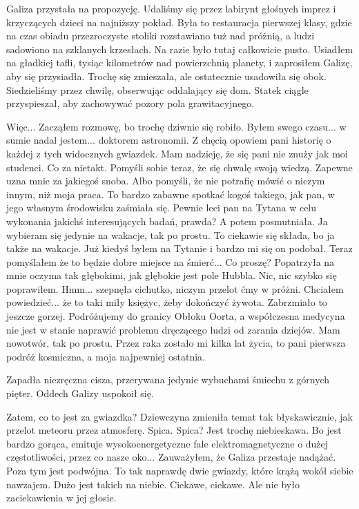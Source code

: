 Galiza przystała na propozycję.
Udaliśmy się przez labirynt głośnych imprez i krzyczących dzieci na najniższy pokład.
Była to restauracja pierwszej klasy, gdzie na czas obiadu przezroczyste stoliki rozstawiano tuż nad próżnią, a ludzi sadowiono na szklanych krzesłach.
Na razie było tutaj całkowicie pusto.
Usiadłem na gładkiej tafli, tysiąc kilometrów nad powierzchnią planety, i zaprosiłem Galizę, aby się przysiadła. Trochę się zmieszała, ale ostatecznie usadowiła się obok.
Siedzieliśmy przez chwilę, obserwując oddalający się dom. Statek ciągle przyspieszał, aby zachowywać pozory pola grawitacyjnego.

\begin{dialogue}
	\ds{} Więc... \dm{} Zacząłem rozmowę, bo trochę dziwnie się robiło. \dm{} Byłem swego czasu... w sumie nadal jestem... doktorem astronomii.
		Z chęcią opowiem pani historię o każdej z tych widocznych gwiazdek. Mam nadzieję, że się pani nie znuży jak moi studenci. \dm{} Co za nietakt. Pomyśli sobie teraz, że się chwalę swoją wiedzą.
		Zapewne uzna mnie za jakiegoś snoba. Albo pomyśli, że nie potrafię mówić o niczym innym, niż moja praca.
	\ds{} To bardzo zabawne spotkać kogoś takiego, jak pan, w jego własnym środowisku \dm{} zaśmiała się. \dm{}
		 Pewnie leci pan na Tytana w celu wykonania jakichś interesujących badań, prawda? \dm{} A potem posmutniała. \dm{} Ja wybieram się jedynie na wakacje, tak po prostu.
	\ds{} To ciekawie się składa, bo ja także na wakacje. Już kiedyś byłem na Tytanie i bardzo mi się on podobał. 
		Teraz pomyślałem że to będzie dobre miejsce na śmierć...
	\ds{} Co proszę? \dm{} Popatrzyła na mnie oczyma tak głębokimi, jak głębokie jest pole Hubbla.
	\ds{} Nic, nic \dm{} szybko się poprawiłem.
	\ds{} Hmm... \dm{} szepnęła cichutko, niczym przelot ćmy w próżni.
	\ds{} Chciałem powiedzieć... że to taki miły księżyc, żeby dokończyć żywota. \dm{} Zabrzmiało to jeszcze gorzej. 
		\dm{} Podróżujemy do granicy Obłoku Oorta, a współczesna medycyna nie jest w stanie naprawić problemu dręczącego ludzi od zarania dziejów. 
		Mam nowotwór, tak po prostu. Przez raka zostało mi kilka lat życia, to pani pierwsza podróż kosmiczna, a moja najpewniej ostatnia.
\end{dialogue}

Zapadła niezręczna cisza, przerywana jedynie wybuchami śmiechu z górnych pięter.
Oddech Galizy uspokoił się.

\begin{dialogue}
	\ds{} Zatem, co to jest za gwiazdka? \dm{} Dziewczyna zmieniła temat tak błyskawicznie, jak przelot meteoru przez atmosferę.
	\ds{} Spica. 
	\ds{} Spica? Jest trochę niebieskawa.
	\ds{} Bo jest bardzo gorąca, emituje wysokoenergetyczne fale elektromagnetyczne o dużej częstotliwości, przez co nasze oko... \dm{} Zauważyłem, że Galiza przestaje nadążać.
		\dm{} Poza tym jest podwójna. To tak naprawdę dwie gwiazdy, które krążą wokół siebie nawzajem. Dużo jest takich na niebie.
	\ds{} Ciekawe, ciekawe. \dm{} Ale nie było zaciekawienia w jej głosie.
\end{dialogue}

